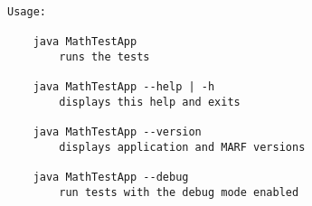 \begin{verbatim}

Usage:

    java MathTestApp
        runs the tests

    java MathTestApp --help | -h
        displays this help and exits

    java MathTestApp --version
        displays application and MARF versions

    java MathTestApp --debug
        run tests with the debug mode enabled

\end{verbatim}
